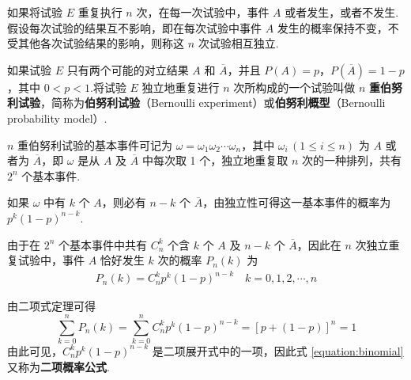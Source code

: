 如果将试验 $E$ 重复执行 $n$ 次，在每一次试验中，事件 $A$ 或者发生，或者不发生.假设每次试验的结果互不影响，即在每次试验中事件 $A$ 发生的概率保持不变，不受其他各次试验结果的影响，则称这 $n$ 次试验相互独立.

如果试验 $E$ 只有两个可能的对立结果 $A$ 和 $\overline{A}$，并且 $P(A)=p$，$P(\overline{A})=1-p$，其中 $0<p<1$.将试验 $E$ 独立地重复进行 $n$ 次所构成的一个试验叫做 $n$ \textbf{重伯努利试验}，简称为\textbf{伯努利试验}（Bernoulli experiment）或\textbf{伯努利概型}（Bernoulli probability model）.

$n$ 重伯努利试验的基本事件可记为 $\omega=\omega_1 \omega_2 \cdots \omega_n$，其中 $\omega_i\,(1\leqslant i\leqslant n)$ 为 $A$ 或者为 $\overline{A}$，即 $\omega$ 是从 $A$ 及 $\overline{A}$ 中每次取 1 个，独立地重复取 $n$ 次的一种排列，共有 $2^n$ 个基本事件.

如果 $\omega$ 中有 $k$ 个 $A$，则必有 $n-k$ 个 $\overline{A}$，由独立性可得这一基本事件的概率为 $p^k (1-p)^{n-k}$.

由于在 $2^n$ 个基本事件中共有 $C_n^k$ 个含 $k$ 个 $A$ 及 $n-k$ 个 $\overline{A}$，因此在 $n$ 次独立重复试验中，事件 $A$ 恰好发生 $k$ 次的概率 $P_n(k)$ 为
\begin{gather} \label{equation:binomial}
    P_n(k)=C_n^k p^k (1-p)^{n-k} \quad k=0,1,2,\cdots,n
\end{gather}

由二项式定理可得
$$
\sum_{k=0}^n P_n(k) = \sum_{k=0}^n C_n^k p^k (1-p)^{n-k} = [p+(1-p)]^n = 1
$$
由此可见，$C_n^k p^k (1-p)^{n-k}$ 是二项展开式中的一项，因此式 \eqref{equation:binomial} 又称为\textbf{二项概率公式}.